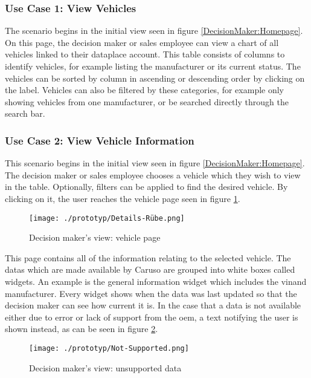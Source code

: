 \subsubsection{Use Case 1: View Vehicles}
The scenario begins in the initial view seen in figure \ref{DecisionMaker:Homepage}. On this page, the decision maker or sales employee can view a chart of all vehicles linked to their \gls{dataplace} account. This table consists of columns to identify vehicles, for example listing the manufacturer or its current status. The vehicles can be sorted by column in ascending or descending order by clicking on the label. Vehicles can also be filtered by these categories, for example only showing vehicles from one manufacturer, or be searched directly through the search bar.

\subsubsection{Use Case 2: View Vehicle Information}
This scenario begins in the initial view seen in figure \ref{DecisionMaker:Homepage}. The decision maker or sales employee chooses a vehicle which they wish to view in the table. Optionally, filters can be applied to find the desired vehicle. By clicking on it, the user reaches the vehicle page seen in figure \ref{DecisionMaker:DetailsRube}.

\begin{figure}[ht]
  \centering
  \texttt{[image: ./prototyp/Details-Rübe.png]}
  \caption{Decision maker's view: vehicle page}
  \label{DecisionMaker:DetailsRube}
\end{figure}

This page contains all of the information relating to the selected vehicle. The \glspl{data} which are made available by Caruso are grouped into white boxes called \glspl{widget}. An example is the general information \gls{widget} which includes the \gls{vin}and manufacturer. Every \gls{widget} shows when the data was last updated so that the decision maker can see how current it is. In the case that a \gls{data} is not available either due to error or lack of support from the \gls{oem}, a text notifying the user is shown instead, as can be seen in figure \ref{DecisionMaker:NotSupported}.


\begin{figure}[ht]
  \centering
  \texttt{[image: ./prototyp/Not-Supported.png]}
  \caption{Decision maker's view: unsupported \gls{data}}
  \label{DecisionMaker:NotSupported}
\end{figure}


